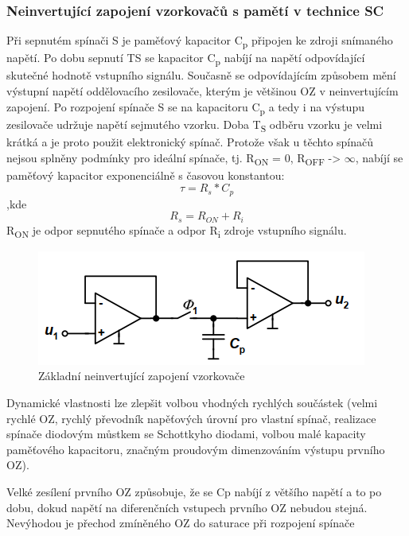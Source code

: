 \subsubsection{Neinvertující zapojení vzorkovačů s pamětí v technice SC}
Při sepnutém spínači S je paměťový kapacitor C\textsubscript{p} připojen ke zdroji snímaného napětí. Po dobu sepnutí TS se kapacitor 
C\textsubscript{p} nabíjí na napětí odpovídající skutečné hodnotě vstupního signálu. Současně se odpovídajícím způsobem mění výstupní napětí oddělovacího zesilovače, kterým je většinou OZ v neinvertujícím zapojení. Po rozpojení spínače S se na kapacitoru 
C\textsubscript{p} a tedy i na výstupu
zesilovače udržuje napětí sejmutého vzorku. Doba T\textsubscript{S} odběru vzorku je velmi krátká a je proto použit elektronický spínač. Protože však u těchto spínačů nejsou splněny podmínky pro ideální spínače, tj. R\textsubscript{ON} = 0, R\textsubscript{OFF} -> $\infty$, nabíjí se paměťový kapacitor exponenciálně s časovou konstantou:
\begin{equation}
\tau = R_{s}*C_{p}
\end{equation}
,kde
\begin{equation}
R_{s} = R_{ON}+ R_{i}
\end{equation}
R\textsubscript{ON} je odpor sepnutého spínače a odpor R\textsubscript{i} zdroje vstupního signálu.
\begin{figure}[h]
   \begin{center}
     \includegraphics[scale=0.6]{images/VzorSC.png}
   \end{center}
   \caption{Základní neinvertující zapojení vzorkovače}
\end{figure}

Dynamické vlastnosti lze zlepšit volbou vhodných rychlých součástek (velmi rychlé OZ, rychlý převodník napěťových úrovní pro vlastní spínač, realizace spínače diodovým můstkem se Schottkyho diodami, volbou malé kapacity paměťového kapacitoru, značným proudovým dimenzováním výstupu prvního OZ).

Velké zesílení prvního OZ způsobuje, že se Cp nabíjí z většího napětí a to po dobu, dokud napětí na diferenčních vstupech prvního OZ nebudou stejná. Nevýhodou je přechod zmíněného OZ do saturace při rozpojení spínače

